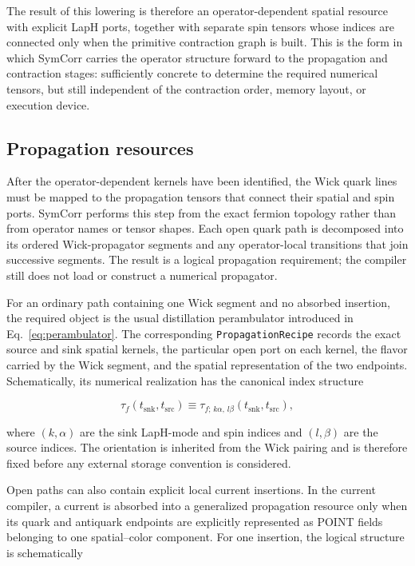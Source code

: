 \documentclass[11pt]{article}
\begin{document}
The result of this lowering is therefore an operator-dependent spatial resource
with explicit LapH ports, together with separate spin tensors whose indices are
connected only when the primitive contraction graph is built. This is the form
in which SymCorr carries the operator structure forward to the propagation and
contraction stages: sufficiently concrete to determine the required numerical
tensors, but still independent of the contraction order, memory layout, or
execution device.

\subsection{Propagation resources}

After the operator-dependent kernels have been identified, the Wick quark lines
must be mapped to the propagation tensors that connect their spatial and spin
ports. SymCorr performs this step from the exact fermion topology rather than
from operator names or tensor shapes. Each open quark path is decomposed into
its ordered Wick-propagator segments and any operator-local transitions that
join successive segments. The result is a logical propagation requirement; the
compiler still does not load or construct a numerical propagator.

For an ordinary path containing one Wick segment and no absorbed insertion, the
required object is the usual distillation perambulator introduced in
Eq.~\eqref{eq:perambulator}. The corresponding \texttt{PropagationRecipe}
records the exact source and sink spatial kernels, the particular open port on
each kernel, the flavor carried by the Wick segment, and the spatial
representation of the two endpoints. Schematically, its numerical realization
has the canonical index structure

\begin{equation}
\tau_f(t_{\mathrm{snk}},t_{\mathrm{src}})
\equiv
\tau_{f;\,k\alpha,\,l\beta}
(t_{\mathrm{snk}},t_{\mathrm{src}}),
\label{eq:propagation_resource_layout}
\end{equation}

where \((k,\alpha)\) are the sink LapH-mode and spin indices and
\((l,\beta)\) are the source indices. The orientation is inherited from the
Wick pairing and is therefore fixed before any external storage convention is
considered.

Open paths can also contain explicit local current insertions. In the current
compiler, a current is absorbed into a generalized propagation resource only
when its quark and antiquark endpoints are explicitly represented as POINT
fields belonging to one spatial--color component. For one insertion, the
logical structure is schematically
\end{document}
